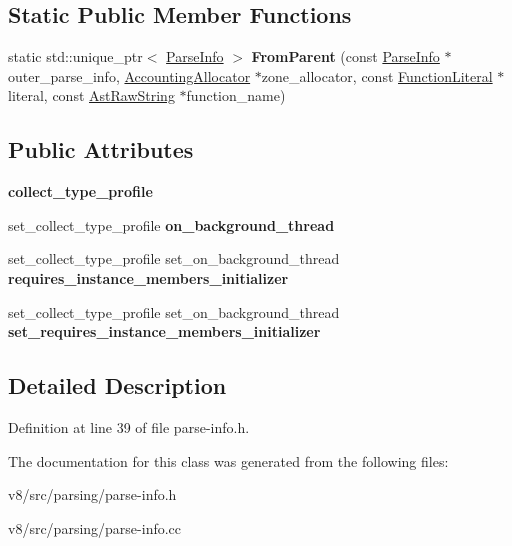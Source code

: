 \subsection*{Static Public Member Functions}
\begin{DoxyCompactItemize}
\item 
\mbox{\label{classv8_1_1internal_1_1ParseInfo_a31f056bab495ccb35717e0e07d66e21b}} 
static std\+::unique\+\_\+ptr$<$ \mbox{\hyperlink{classv8_1_1internal_1_1ParseInfo}{Parse\+Info}} $>$ {\bfseries From\+Parent} (const \mbox{\hyperlink{classv8_1_1internal_1_1ParseInfo}{Parse\+Info}} $\ast$outer\+\_\+parse\+\_\+info, \mbox{\hyperlink{classv8_1_1internal_1_1AccountingAllocator}{Accounting\+Allocator}} $\ast$zone\+\_\+allocator, const \mbox{\hyperlink{classv8_1_1internal_1_1FunctionLiteral}{Function\+Literal}} $\ast$literal, const \mbox{\hyperlink{classv8_1_1internal_1_1AstRawString}{Ast\+Raw\+String}} $\ast$function\+\_\+name)
\end{DoxyCompactItemize}
\subsection*{Public Attributes}
\begin{DoxyCompactItemize}
\item 
\mbox{\label{classv8_1_1internal_1_1ParseInfo_ab6759de03f0600057a88c06d0ee5610e}} 
{\bfseries collect\+\_\+type\+\_\+profile}
\item 
\mbox{\label{classv8_1_1internal_1_1ParseInfo_acb160f8fefe11a318e346f3cd0bf14d0}} 
set\+\_\+collect\+\_\+type\+\_\+profile {\bfseries on\+\_\+background\+\_\+thread}
\item 
\mbox{\label{classv8_1_1internal_1_1ParseInfo_a7d85188aef018b8d62348a6414229ec0}} 
set\+\_\+collect\+\_\+type\+\_\+profile set\+\_\+on\+\_\+background\+\_\+thread {\bfseries requires\+\_\+instance\+\_\+members\+\_\+initializer}
\item 
\mbox{\label{classv8_1_1internal_1_1ParseInfo_ab78d76ee7ca84e739e1fd8d8561ed4ca}} 
set\+\_\+collect\+\_\+type\+\_\+profile set\+\_\+on\+\_\+background\+\_\+thread {\bfseries set\+\_\+requires\+\_\+instance\+\_\+members\+\_\+initializer}
\end{DoxyCompactItemize}


\subsection{Detailed Description}


Definition at line 39 of file parse-\/info.\+h.



The documentation for this class was generated from the following files\+:\begin{DoxyCompactItemize}
\item 
v8/src/parsing/parse-\/info.\+h\item 
v8/src/parsing/parse-\/info.\+cc\end{DoxyCompactItemize}
